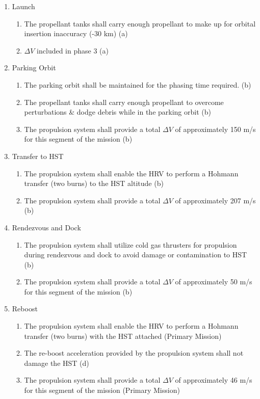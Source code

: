 \documentclass[paper=letter, fontsize=11pt]{scrartcl} %
\numberwithin{equation}{section} %
\numberwithin{figure}{section} %
\numberwithin{table}{section} %
\begin{document}
\begin{enumerate}
\item Launch
\begin{enumerate}
    \item The propellant tanks shall carry enough propellant to make up for orbital insertion inaccuracy (-30 km) (a)
    \item $\Delta V$ included in phase 3 (a)
\end{enumerate}
\item Parking Orbit
\begin{enumerate}
    \item The parking orbit shall be maintained for the phasing time required. (b)
    \item The propellant tanks shall carry enough propellant to overcome perturbations \& dodge debris while in the parking orbit (b)
    \item The propulsion system shall provide a total $\Delta V$ of approximately 150 m/s for this segment of the mission (b)
\end{enumerate}
\item Transfer to HST
\begin{enumerate}
    \item The propulsion system shall enable the HRV to perform a Hohmann transfer (two burns) to the HST altitude (b)
    \item The propulsion system shall provide a total $\Delta V$ of approximately 207 m/s (b)
\end{enumerate}
\item Rendezvous and Dock
\begin{enumerate}
    \item The propulsion system shall utilize cold gas thrusters for propulsion during rendezvous and dock to avoid damage or contamination to HST (b)
    \item The propulsion system shall provide a total $\Delta V$ of approximately 50 m/s for this segment of the mission (b)
\end{enumerate}
\item Reboost
\begin{enumerate}
    \item The propulsion system shall enable the HRV to perform a Hohmann transfer (two burns) with the HST attached (Primary Mission)
    \item The re-boost acceleration provided by the propulsion system shall not damage the HST (d)
    \item The propulsion system shall provide a total $\Delta V$ of approximately 46 m/s for this segment of the mission (Primary Mission)

\end{enumerate}
\end{enumerate}
\end{document}
